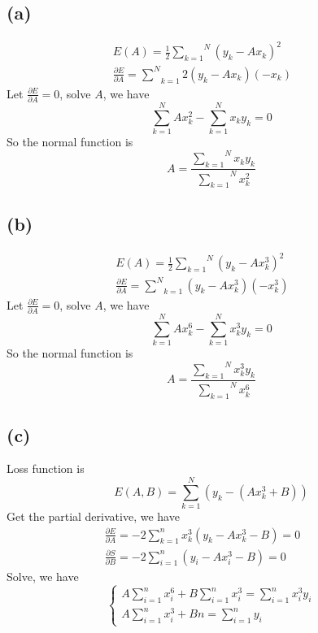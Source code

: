 \documentclass{article}
\begin{document}
{{\begin{answer}
  \ 
\end{answer}

\subsection*{(a)}

\begin{eqnarray*}
  E (A) = \frac{1}{2} \overset{N}{\underset{k = 1}{\sum}} (y_k - A x_k)^2 &  &
  \\
  \frac{\partial E}{\partial A} = \underset{k = 1}{\overset{N}{\sum}} 2 (y_k -
  A x_k) (- x_k) &  & 
\end{eqnarray*}
Let $\frac{\partial E}{\partial A} = 0$, solve $A$, we have
\begin{equation}
  \overset{N}{\underset{k = 1}{\sum}} Ax^2_k - \overset{N}{\underset{k =
  1}{\sum}} x_k y_k = 0
\end{equation}
So the normal function is
\[ A = \frac{\overset{N}{\underset{k = 1}{\sum}} x_k
   y_k}{\overset{N}{\underset{k = 1}{\sum}} x^2_k} \]

\subsection*{(b)}

\begin{eqnarray*}
  E (A) = \frac{1}{2} \overset{N}{\underset{k = 1}{\sum}} (y_k - A x^3_k)^2 & 
  & \\
  \frac{\partial E}{\partial A} = \underset{k = 1}{\overset{N}{\sum}} (y_k - A
  x^3_k) (- x^3_k) &  & 
\end{eqnarray*}
Let $\frac{\partial E}{\partial A} = 0$, solve $A$, we have
\begin{equation}
  \overset{N}{\underset{k = 1}{\sum}} Ax^6_k - \overset{N}{\underset{k =
  1}{\sum}} x^3_k y_k = 0
\end{equation}
So the normal function is
\[ A = \frac{\overset{N}{\underset{k = 1}{\sum}} x^3_k
   y_k}{\overset{N}{\underset{k = 1}{\sum}} x^6_k} \]


\subsection*{(c)}

Loss function is
\[ E (A, B) = \underset{k = 1}{\overset{N}{\sum}} (y_k - (Ax_k^3 + B)) \]
Get the partial derivative, we have
\[ \  \]
\begin{eqnarray*}
  \frac{\partial E}{\partial A} = - 2 \sum_{k = 1}^n x_k^3  (y_k - Ax_k^3 - B)
  = 0 &  & \\
  \frac{\partial S}{\partial B} = - 2 \sum_{i = 1}^n (y_i - Ax_i^3 - B) = 0 & 
  & 
\end{eqnarray*}
Solve, we have
\[ \left\{\begin{array}{l}
     A \sum_{i = 1}^n x_i^6 + B \sum_{i = 1}^n x_i^3 = \sum_{i = 1}^n x_i^3
     y_i\\
     A \sum_{i = 1}^n x_i^3 + Bn = \sum_{i = 1}^n y_i
   \end{array}\right. \]


}}
\end{document}
